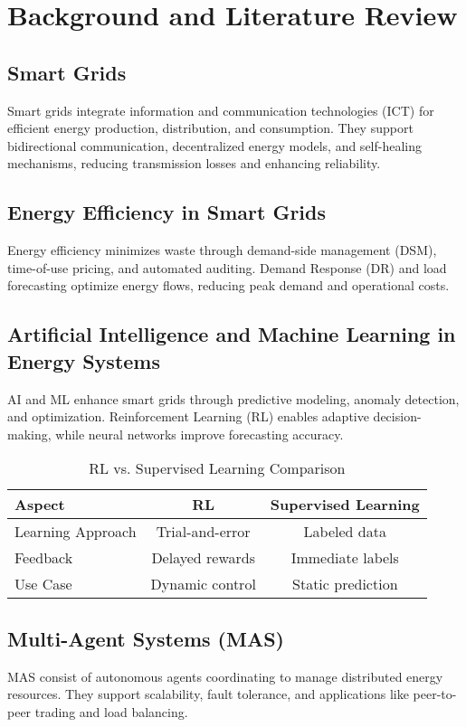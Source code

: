 \documentclass[12pt, a4paper, oneside]{book}
\begin{document}
\chapter{Background and Literature Review}
\section{Smart Grids}
Smart grids integrate information and communication technologies (ICT) for efficient energy production, distribution, and consumption. They support bidirectional communication, decentralized energy models, and self-healing mechanisms, reducing transmission losses and enhancing reliability.

\section{Energy Efficiency in Smart Grids}
Energy efficiency minimizes waste through demand-side management (DSM), time-of-use pricing, and automated auditing. Demand Response (DR) and load forecasting optimize energy flows, reducing peak demand and operational costs.

\section{Artificial Intelligence and Machine Learning in Energy Systems}
AI and ML enhance smart grids through predictive modeling, anomaly detection, and optimization. Reinforcement Learning (RL) enables adaptive decision-making, while neural networks improve forecasting accuracy.

\begin{table}[h]
    \centering
    \caption{RL vs. Supervised Learning Comparison}
    \begin{tabular}{lcc}
        \toprule
        \textbf{Aspect} & \textbf{RL} & \textbf{Supervised Learning} \\
        \midrule
        Learning Approach & Trial-and-error & Labeled data \\
        Feedback & Delayed rewards & Immediate labels \\
        Use Case & Dynamic control & Static prediction \\
        \bottomrule
    \end{tabular}
\end{table}

\section{Multi-Agent Systems (MAS)}
MAS consist of autonomous agents coordinating to manage distributed energy resources. They support scalability, fault tolerance, and applications like peer-to-peer trading and load balancing.
\end{document}
